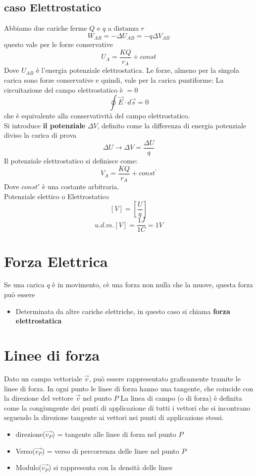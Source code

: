 \documentclass[a4paper]{report}
\begin{document}
  \subsection{caso Elettrostatico}
  Abbiamo due cariche ferme $Q$ e $q$ a distanza $r$
  $$ W_{AB} = - \Delta U_{AB} = -q \Delta V_{AB}$$
  questo vale per le forze conservative
  $$ U_{A} = \frac{KQ}{r_A} + const $$
  Dove $U_{AB}$ è l'energia potenziale elettrostatica. Le forze, almeno per la singola carica sono forze conservative e quindi, vale per la carica puntiforme: La circuitazione del campo elettrostatico è $=0$
  $$ \oint \vec{E} \cdot d\vec{s} = 0 $$
  che è equivalente alla conservatività del campo elettrostatico.\\
  Si introduce \textbf{il potenziale} $\Delta V$, definito come la differenza di energia potenziale diviso la carica di prova
  $$ \Delta U \longrightarrow \Delta V = \frac{\Delta U}{q} $$
  Il potenziale elettrostatico si definisce come:
  $$ V_A = \frac{KQ}{r_A} + const^{'}$$
  Dove $const'$ è una costante arbitraria.\\
  Potenziale elettico o Elettrostatico
  $$ [V] = [\frac{U}{q}]$$
  $$u.d.m.[V] = \frac{1J}{1C} = 1V$$

  \section{Forza Elettrica}
  Se una carica $q$ è in movimento, cè una forza non nulla che la muove, questa forza può essere
  \begin{itemize}
    \item Determinata da altre cariche elettriche, in questo caso si chiama \textbf{forza elettrostatica}
  \end{itemize}

  \section{Linee di forza}
  Dato un campo vettoriale $\vec{v}$, può essere rappresentato graficamente tramite le linee di forza. In ogni punto le linee di forza hanno una tangente, che coincide con la direzione del vettore $\vec{v}$ nel punto $P$
  La linea di campo (o di forza) è definita come la congiungente dei punti di applicazione di tutti i vettori che si incontrano seguendo la direzione tangente ai vettori nei punti di applicazione stessi.
  \begin{itemize}
    \item direzione($\vec{v_P}$) = tangente alle linee di forza nel punto $P$
    \item Verso($\vec{v_P}$) = verso di percorrenza delle linee nel punto $P$
    \item Modulo($\vec{v_P}$) si rappresenta con la densità delle linee
  \end{itemize}
\end{document}
